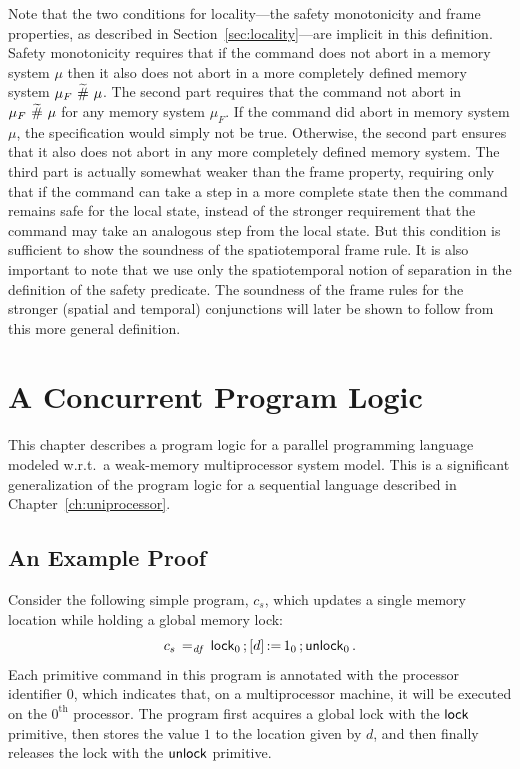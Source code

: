 \documentclass[11pt]{report}
\begin{document}
Note that the two conditions for locality---the safety monotonicity and frame properties, as described in Section~\ref{sec:locality}---are implicit in this definition. Safety monotonicity requires that if the command does not abort in a memory system $\mu$ then it also does not abort in a more completely defined memory system $\mu_F \operatorname{\,\widetilde{\#}\,} \mu$. The second part requires that the command not abort in $\mu_F \operatorname{\,\widetilde{\#}\,} \mu$ for any memory system $\mu_F$. If the command did abort in memory system $\mu$, the specification would simply not be true. Otherwise, the second part ensures that it also does not abort in any more completely defined memory system. The third part is actually somewhat weaker than the frame property, requiring only that if the command can take a step in a more complete state then the command remains safe for the local state, instead of the stronger requirement that the command may take an analogous step from the local state. But this condition is sufficient to show the soundness of the spatiotemporal frame rule. It is also important to note that we use only the spatiotemporal notion of separation in the definition of the safety predicate. The soundness of the frame rules for the stronger (spatial and temporal) conjunctions will later be shown to follow from this more general definition.

\chapter{A Concurrent Program Logic}
\label{ch:multiprocessor}

This chapter describes a program logic for a parallel programming language modeled w.r.t.\ a weak-memory multiprocessor system model. This is a significant generalization of the program logic for a sequential language described in Chapter~\ref{ch:uniprocessor}. 

\section{An Example Proof}
\label{sec:concurrent-example}

Consider the following simple program, $c_s$, which updates a single memory location while holding a global memory lock: \[ c_s \operatorname{\;=_{\mathit{df}}\;} \operatorname{\mathsf{lock}}_0 \operatorname{;} \left[ d \right] \operatorname{:\!=} 1_0 \operatorname{;} \operatorname{\mathsf{unlock}}_0. \] Each primitive command in this program is annotated with the processor identifier $0$, which indicates that, on a multiprocessor machine, it will be executed on the $0^{\mathrm{th}}$ processor. The program first acquires a global lock with the $\operatorname{\mathsf{lock}}$
 primitive, then stores the value $1$ to the location given by $d$, and then finally releases the lock with the $\operatorname{\mathsf{unlock}}$ primitive. 
\end{document}

